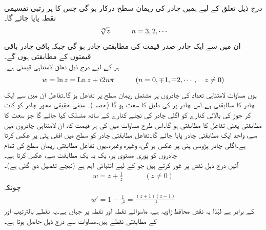 \quad {}\\
درج ذیل تعلق کے لیے ہمیں  چادر کی ریمان سطح درکار ہو گی جس کا  پر    رتبی تقسیمی نقطہ پایا جائے گا۔
\begin{align}
\sqrt[\leftroot{-2}\uproot{2}n]{z}\quad \quad \quad n=3,2,\cdots
\end{align}
ان میں سے ایک چادر صدر قیمت کی مطابقتی چادر ہو گی جبکہ باقی  چادر باقی  قیمتوں کے مطابقتی ہوں گے۔
\quad {}\\
ہر  کے لیے درج ذیل  تعلق لامتناہی قیمتی ہے۔
\begin{align}\label{مساوات_نقش_ریمان_سطح_لوگارتھم}
w=\ln z=\operatorname{Ln} z+i2n\pi\quad \quad \quad (n=0,\mp1,\mp2,\cdots,\quad z\ne 0)
\end{align}
یوں مساوات  لامتناہی تعداد کی چادروں پر مشتمل ریمان سطح پر تفاعل ہو گا۔تفاعل  ان میں سے ایک چادر  کا مطابقتی ہے۔اس چادر پر  کی دلیل  کا سعت  ہو گا (حصہ )۔ منفی حقیقی محور چادر کو کاٹ کر جوڑ کی بالائی کنارے کو  اگلی چادر کی نچلے کنارے کے ساتھ منسلک کیا جائے گا جو سعت  کا مطابقتی یعنی تفاعل  کا مطابقتی ہو گا۔اس طرح  مساوات  میں  کی ہر قیمت کا، ان لامتناہی چادروں میں سے،  واحد ایک مطابقتی چادر پایا جائے گا۔تفاعل  مطابقتی چادر کو  سطح میں  افقی پٹی  پر عکس کرتا ہے۔اگلی چادر پڑوسی پٹی  پر عکس ہو گی، وغیرہ وغیرہ۔یوں تفاعل  مطابقتی ریمان سطح کی تمام چادروں کو  پوری  مستوی پر، یک بہ یک مطابقت سے، عکس کرتا ہے۔
\quad {}\\
آئیں درج ذیل نقش پر غور کرتے ہیں جو  کے لیے انتہائی اہم ہے (نیچے تفصیل دی گئی ہے)۔
\begin{align}\label{مساوات_نقش_ہوائی_حرکیات_الف}
w=z+\frac{1}{z}\quad \quad \quad (z\ne 0)
\end{align}
چونکہ 
\begin{align*}
w'=1-\frac{1}{z^2}=\frac{(z+1)(z-1)}{z^2}
\end{align*}
کے برابر ہے لہٰذا یہ نقش محافظ زاویہ ہے، ماسوائے  نقطہ  اور نقطہ   پر جہاں  ہے۔یہ نقطے بالترتیب  اور  کے مطابقتی نقطے ہیں۔مساوات  سے درج ذیل حاصل ہوتا ہے۔
